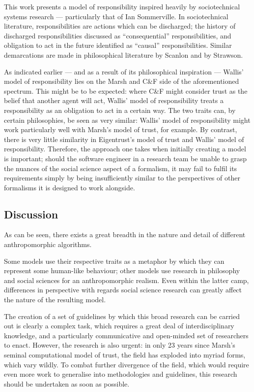 This work presents a model of responsibility inspired heavily by sociotechnical systems research --- particularly that of Ian Sommerville\cite{Sommerville:2007ec}. In sociotechnical literature, responsibilities are actions which can be discharged; the history of discharged responsibilities discussed as ``consequential'' responsibilities, and obligation to act in the future identified as ``causal'' responsibilities. Similar demarcations are made in philosophical literature by Scanlon\cite{scanlon2006justice} and by Strawson\cite{strawson}.\par

As indicated earlier --- and as a result of its philosophical inspiration --- Wallis' model of responsibility lies on the Marsh and C\&F side of the aforementioned spectrum. This might be to be expected: where C\&F might consider trust as the belief that another agent will act, Wallis' model of responsibility treats a responsibility as an obligation to act in a certain way. The two traits can, by certain philosophies, be seen as very similar: Wallis' model of responsibility might work particularly well with Marsh's model of trust, for example. By contrast, there is very little similarity in Eigentrust's model of trust and Wallis' model of responsibility. Therefore, the approach one takes when initially creating a model is important; should the software engineer in a research team be unable to grasp the nuances of the social science aspect of a formalism, it may fail to fulfil its requirements simply by being insufficiently similar to the perspectives of other formalisms it is designed to work alongside.\par

\subsection{Discussion}
As can be seen, there exists a great breadth in the nature and detail of different anthropomorphic algorithms.\par

Some models use their respective traits as a metaphor by which they can represent some human-like behaviour; other models use research in philosophy and social sciences for an anthropomorphic realism. Even within the latter camp, differences in perspective with regards social science research can greatly affect the nature of the resulting model.\par

The creation of a set of guidelines by which this broad research can be carried out is clearly a complex task, which requires a great deal of interdisciplinary knowledge, and a particularly communicative and open-minded set of researchers to enact. However, the research is also urgent: in only 23 years since Marsh's seminal computational model of trust, the field has exploded into myriad forms, which vary wildly. To combat further divergence of the field, which would require even more work to generalise into methodologies and guidelines, this research should be undertaken as soon as possible.\par

